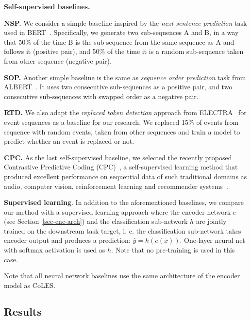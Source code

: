 \documentclass{article}
\begin{document}
\textbf{Self-supervised baselines.} 

\textbf{NSP.} We consider a simple baseline inspired by the \textit{next sentence prediction} task used in BERT~\citep{Devlin2019BERTPO}. Specifically, we generate two sub-sequences A and B, in a way that 50\% of the time B is the sub-sequence from the same sequence as A and follows it (positive pair), and 50\% of the time it is a random sub-sequence taken from other sequence (negative pair).

\textbf{SOP.} Another simple baseline is the same as \textit{sequence order prediction} task from ALBERT~\citep{Lan2020ALBERTAL}. It uses two consecutive sub-sequences as a positive pair, and two consecutive sub-sequences with swapped order as a negative pair.

\textbf{RTD.} We also adapt the \textit{replaced token detection} approach from ELECTRA~\citep{Clark2020ELECTRAPT} for event sequences as a baseline for our research. We replaced 15\% of events from sequence with random events, taken from other sequences and train a model to predict whether an event is replaced or not.

\textbf{CPC.} As the last self-supervised baseline, we selected the recently proposed Contrastive Predictive Coding (CPC)~\citep{Oord2018RepresentationLW}, a self-supervised learning method that produced excellent performance on sequential data of such traditional domains as audio, computer vision, reinforcement learning and recommender systems~\citep{Zhou2020ContrastiveLF}.

\textbf{Supervised learning}. In addition to the aforementioned baselines, we compare our method with a supervised learning approach where the encoder network $e$ (see Section~\ref{sec-enc-arch}) and the classification sub-network $h$ are jointly trained on the downstream task target, i. e. the classification sub-network takes encoder output and produces a prediction: $\hat{y} = h(e(x))$. One-layer neural net with softmax activation is used as $h$. Note that no pre-training is used in this case.

Note that all neural network baselines use the same architecture of the encoder model as CoLES.


\subsection{Results} \label{sec-res}
\end{document}
